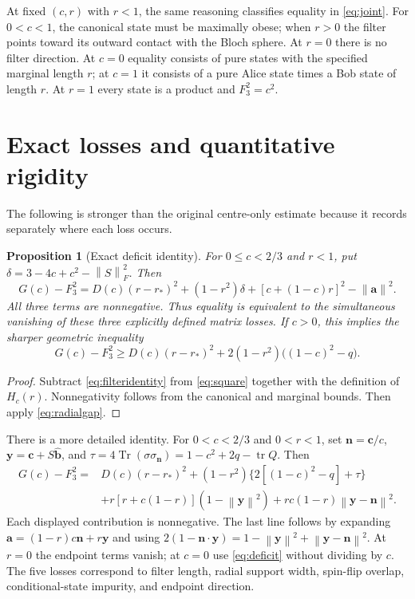 \documentclass[11pt,a4paper]{article}
\newtheorem{proposition}[theorem]{Proposition}
\theoremstyle{remark}\newtheorem{remark}[theorem]{Remark}
\newcommand{\Tr}{\operatorname{Tr}}
\newcommand{\tr}{\operatorname{tr}}
\newcommand{\norm}[1]{\left\lVert#1\right\rVert}
\renewcommand{\aa}{\mathbf a}\newcommand{\bb}{\mathbf b}
\newcommand{\cc}{\mathbf c}\newcommand{\nn}{\mathbf n}
\newcommand{\yy}{\mathbf y}
\begin{document}
At fixed $(c,r)$ with $r<1$, the same reasoning classifies equality in
\eqref{eq:joint}. For $0<c<1$, the canonical state must be maximally obese;
when $r>0$ the filter points toward its outward contact with the Bloch sphere.
At $r=0$ there is no filter direction. At $c=0$ equality consists of pure
states with the specified marginal length $r$; at $c=1$ it consists of a
pure Alice state times a Bob state of length $r$. At $r=1$ every state is a
product and $F_3^2=c^2$.

\section{Exact losses and quantitative rigidity}\label{sec:rigidity}
The following is stronger than the original centre-only estimate because it
records separately where each loss occurs.
\begin{proposition}[Exact deficit identity]\label{prop:deficit}
For $0\leq c<2/3$ and $r<1$, put
$\delta=3-4c+c^2-\norm S_F^2$. Then
\begin{equation}\label{eq:deficit}
G(c)-F_3^2=D(c)(r-r_*)^2+(1-r^2)\delta
+[c+(1-c)r]^2-\norm\aa^2.
\end{equation}
All three terms are nonnegative. Thus equality is equivalent to the
simultaneous vanishing of these three explicitly defined matrix losses.
If $c>0$, this implies the sharper geometric inequality
\begin{equation}\label{eq:strongrigidity}
G(c)-F_3^2\geq D(c)(r-r_*)^2
+2(1-r^2)\big((1-c)^2-q\big).
\end{equation}
\end{proposition}
\begin{proof}
Subtract \eqref{eq:filteridentity} from \eqref{eq:square} together with
the definition of $H_c(r)$. Nonnegativity follows from the canonical and
marginal bounds. Then apply \eqref{eq:radialgap}.
\end{proof}

There is a more detailed identity. For $0<c<2/3$ and $0<r<1$, set
$\nn=\cc/c$, $\yy=\cc+S\widehat{\bb}$, and
$\tau=4\Tr(\sigma\sigma_{\nn})=1-c^2+2q-\tr Q$. Then
\begin{align}\label{eq:five}
G(c)-F_3^2={}&D(c)(r-r_*)^2+(1-r^2)\{2[(1-c)^2-q]+\tau\}\nonumber\\
&+r[r+c(1-r)](1-\norm\yy^2)+rc(1-r)\norm{\yy-\nn}^2.
\end{align}
Each displayed contribution is nonnegative. The last line follows by
expanding $\aa=(1-r)c\nn+r\yy$ and using
$2(1-\nn\cdot\yy)=1-\norm\yy^2+\norm{\yy-\nn}^2$.
At $r=0$ the endpoint terms vanish; at $c=0$ use \eqref{eq:deficit} without
dividing by $c$. The five losses correspond to filter length, radial support
width, spin-flip overlap, conditional-state impurity, and endpoint direction.
\end{document}
